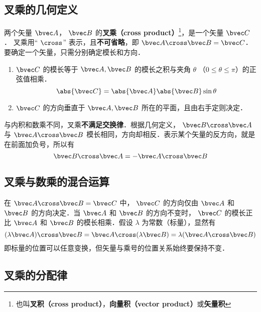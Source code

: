 

\subsection{叉乘的几何定义}
两个矢量 $\bvec A$，  $\bvec B$ 的\textbf{叉乘（cross product）}\footnote{也叫\textbf{叉积（cross product）}，\textbf{向量积（vector product）}或\textbf{矢量积}}，是一个矢量 $\bvec C$．  叉乘用“ $\cross$” 表示，且\textbf{不可省略}，即 $ \bvec A \cross \bvec B = \bvec C$．要确定一个矢量，只需分别确定模长和方向．

\begin{enumerate}
\item $\bvec C$ 的模长等于 $\bvec A, \bvec B$ 的模长之积与夹角 $\theta$ （$0 \leqslant \theta \leqslant \pi$）的正弦值相乘．
\begin{equation}\label{Cross_eq1}
\abs{\bvec C}  = \abs{\bvec A} \abs{\bvec B} \sin\theta 
\end{equation}
\item $\bvec C$ 的方向垂直于 $\bvec A, \bvec B$ 所在的平面，且由右手定则决定．
\end{enumerate}

与内积和数乘不同，叉乘\textbf{不满足交换律}．根据几何定义， $\bvec B \cross \bvec A$ 与 $\bvec A \cross \bvec B$ 模长相同，方向却相反．表示某个矢量的反方向，就是在前面加负号，所以有
\begin{equation}\label{Cross_eq11}
\bvec B \cross \bvec A = -\bvec A \cross \bvec B
\end{equation}

\subsection{叉乘与数乘的混合运算}

在 $\bvec A \cross \bvec B = \bvec C$ 中， $\bvec C$ 的方向仅由 $\bvec A$ 和 $\bvec B$ 的方向决定．当 $\bvec A$ 和 $\bvec B$ 的方向不变时， $\bvec C$ 的模长正比 $\bvec A$ 和 $\bvec B$ 的模长相乘．假设 $\lambda $ 为常数（标量），显然有
\begin{equation}
(\lambda \bvec A) \cross \bvec B = \bvec A \cross (\lambda \bvec B) = \lambda (\bvec A \cross \bvec B)
\end{equation}
即标量的位置可以任意变换，但矢量与乘号的位置关系始终要保持不变．

\subsection{叉乘的分配律}

